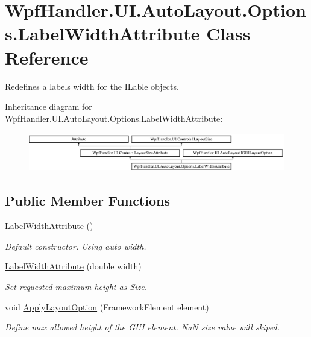 \hypertarget{class_wpf_handler_1_1_u_i_1_1_auto_layout_1_1_options_1_1_label_width_attribute}{}\section{Wpf\+Handler.\+U\+I.\+Auto\+Layout.\+Options.\+Label\+Width\+Attribute Class Reference}
\label{class_wpf_handler_1_1_u_i_1_1_auto_layout_1_1_options_1_1_label_width_attribute}


Redefines a label\textquotesingle{}s width for the I\+Lable objects.  


Inheritance diagram for Wpf\+Handler.\+U\+I.\+Auto\+Layout.\+Options.\+Label\+Width\+Attribute\+:\begin{figure}[H]
\begin{center}
\leavevmode
\includegraphics[height=1.696970cm]{d2/d77/class_wpf_handler_1_1_u_i_1_1_auto_layout_1_1_options_1_1_label_width_attribute}
\end{center}
\end{figure}
\subsection*{Public Member Functions}
\begin{DoxyCompactItemize}
\item 
\mbox{\hyperlink{class_wpf_handler_1_1_u_i_1_1_auto_layout_1_1_options_1_1_label_width_attribute_a466768b6dfd74a49bcae860cb52ab7ab}{Label\+Width\+Attribute}} ()
\begin{DoxyCompactList}\small\item\em Default constructor. Using auto width. \end{DoxyCompactList}\item 
\mbox{\hyperlink{class_wpf_handler_1_1_u_i_1_1_auto_layout_1_1_options_1_1_label_width_attribute_a24991b7cdbc8d575106a41fd7573ad92}{Label\+Width\+Attribute}} (double width)
\begin{DoxyCompactList}\small\item\em Set requested maximum height as Size. \end{DoxyCompactList}\item 
void \mbox{\hyperlink{class_wpf_handler_1_1_u_i_1_1_auto_layout_1_1_options_1_1_label_width_attribute_ab8dae5f847875d310747599429c5054a}{Apply\+Layout\+Option}} (Framework\+Element element)
\begin{DoxyCompactList}\small\item\em Define max allowed height of the G\+UI element. NaN size value will skiped. \end{DoxyCompactList}\end{DoxyCompactItemize}
